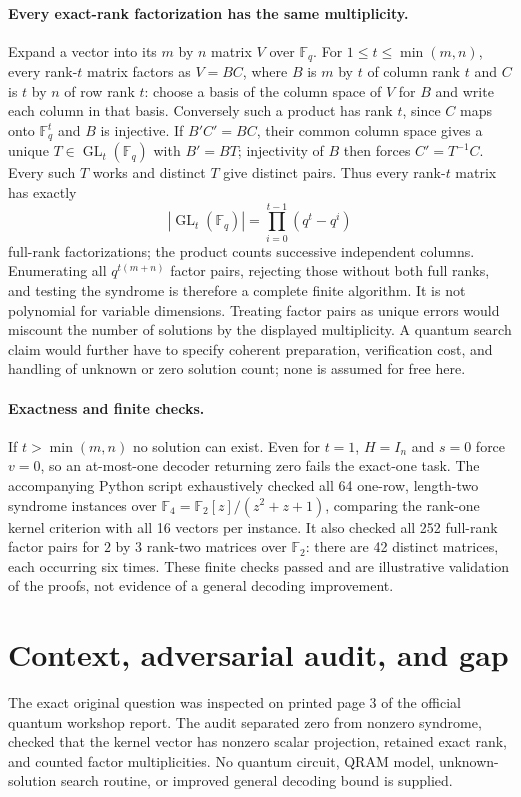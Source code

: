 \documentclass[11pt]{article}
\begin{document}
\paragraph{Every exact-rank factorization has the same multiplicity.}
Expand a vector into its $m$ by $n$ matrix $V$ over $\mathbb F_q$.
For $1\le t\le\min(m,n)$, every rank-$t$ matrix factors as $V=BC$,
where $B$ is $m$ by $t$ of column rank $t$ and $C$ is $t$ by $n$ of row
rank $t$: choose a basis of the column space of $V$ for $B$ and write each
column in that basis. Conversely such a product has rank $t$, since $C$
maps onto $\mathbb F_q^t$ and $B$ is injective.
If $B'C'=BC$, their common column space gives a unique
$T\in\operatorname{GL}_t(\mathbb F_q)$ with $B'=BT$; injectivity of
$B$ then forces $C'=T^{-1}C$. Every such $T$ works and distinct $T$ give
distinct pairs. Thus every rank-$t$ matrix has exactly
\[
|\operatorname{GL}_t(\mathbb F_q)|=\prod_{i=0}^{t-1}(q^t-q^i)
\]
full-rank factorizations; the product counts successive independent columns.
Enumerating all $q^{t(m+n)}$ factor pairs, rejecting those without both full
ranks, and testing the syndrome is therefore a complete finite algorithm.
It is not polynomial for variable dimensions. Treating factor pairs as unique
errors would miscount the number of solutions by the displayed multiplicity.
A quantum search claim would further have to specify coherent preparation,
verification cost, and handling of unknown or zero solution count; none is
assumed for free here.

\paragraph{Exactness and finite checks.}
If $t>\min(m,n)$ no solution can exist. Even for $t=1$, $H=I_n$ and $s=0$
force $v=0$, so an at-most-one decoder returning zero fails the exact-one task.
The accompanying Python script exhaustively checked all 64 one-row,
length-two syndrome instances over $\mathbb F_4=\mathbb F_2[z]/(z^2+z+1)$,
comparing the rank-one kernel criterion with all 16 vectors per instance.
It also checked all 252 full-rank factor pairs for $2$ by $3$ rank-two
matrices over $\mathbb F_2$: there are 42 distinct matrices, each occurring
six times. These finite checks passed and are illustrative validation of the
proofs, not evidence of a general decoding improvement.

\section{Context, adversarial audit, and gap}
The exact original question was inspected on printed page 3 of the official
quantum workshop report. The audit separated zero from nonzero syndrome,
checked that the kernel vector has nonzero scalar projection, retained exact
rank, and counted factor multiplicities. No quantum circuit, QRAM model,
unknown-solution search routine, or improved general decoding bound is supplied.
\end{document}

